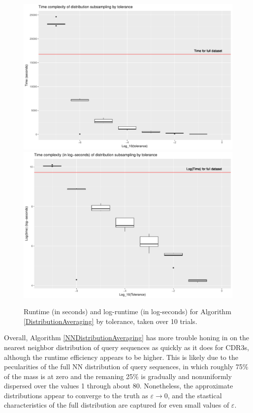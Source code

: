 \documentclass{article}
\begin{document}
\begin{figure}
    \includegraphics[width=0.9\linewidth]{Figures/NearestNeighbor/Sequence/time_by_tol.pdf}
    \includegraphics[width=0.9\linewidth]{Figures/NearestNeighbor/Sequence/log_time_by_tol.pdf}
    \caption{Runtime (in seconds) and log-runtime (in log-seconds) for Algorithm \ref{DistributionAveraging} by tolerance, taken over 10 trials.}
    \label{fig:NNTimesSequence}
\end{figure}
Overall, Algorithm \ref{NNDistributionAveraging} has more trouble honing in on the nearest neighbor distribution of query sequences as quickly as it does for CDR3s, although the runtime efficiency appears to be higher.
This is likely due to the pecularities of the full NN distribution of query sequences, in which roughly 75\% of the mass is at zero and the remaning 25\% is gradually and nonuniformly dispersed over the values 1 through about 80.
Nonetheless, the approximate distributions appear to converge to the truth as $\varepsilon \to 0$, and the stastical characteristics of the full distribution are captured for even small values of $\varepsilon$.
\end{document}
